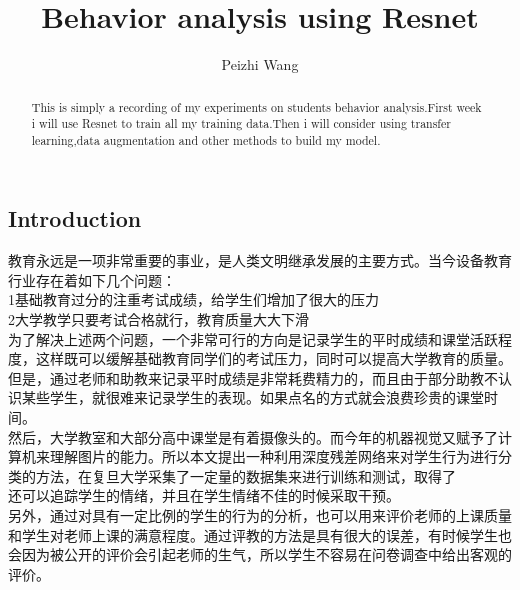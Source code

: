 \documentclass[]{article}
\title{Behavior analysis using Resnet}
\author{Peizhi Wang}
\begin{document}
\maketitle

\begin{abstract}
This is simply a recording of my experiments on students behavior analysis.First week i will use Resnet to train all my training data.Then i will consider using transfer learning,data augmentation and other methods to build my model. 
\end{abstract}
\begin{CJK}{UTF8}{} 
\section{Introduction}
教育永远是一项非常重要的事业，是人类文明继承发展的主要方式。当今设备教育行业存在着如下几个问题：\\
1基础教育过分的注重考试成绩，给学生们增加了很大的压力\\
2大学教学只要考试合格就行，教育质量大大下滑\\
为了解决上述两个问题，一个非常可行的方向是记录学生的平时成绩和课堂活跃程度，这样既可以缓解基础教育同学们的考试压力，同时可以提高大学教育的质量。\\
但是，通过老师和助教来记录平时成绩是非常耗费精力的，而且由于部分助教不认识某些学生，就很难来记录学生的表现。如果点名的方式就会浪费珍贵的课堂时间。\\
然后，大学教室和大部分高中课堂是有着摄像头的。而今年的机器视觉又赋予了计算机来理解图片的能力。所以本文提出一种利用深度残差网络来对学生行为进行分类的方法，在复旦大学采集了一定量的数据集来进行训练和测试，取得了\\
还可以追踪学生的情绪，并且在学生情绪不佳的时候采取干预。\\
另外，通过对具有一定比例的学生的行为的分析，也可以用来评价老师的上课质量和学生对老师上课的满意程度。通过评教的方法是具有很大的误差，有时候学生也会因为被公开的评价会引起老师的生气，所以学生不容易在问卷调查中给出客观的评价。\\

\end{CJK}
\end{document}
